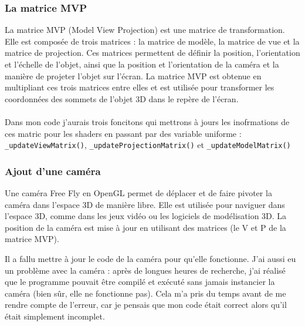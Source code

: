 \documentclass[10pt,a4paper]{article}
\begin{document}
			
		

		\subsubsection{La matrice MVP} %
			La matrice MVP (Model View Projection) est une matrice de transformation. Elle est composée de trois matrices : la matrice de modèle, la matrice de vue et la matrice de projection. Ces matrices permettent de définir la position, l'orientation et l'échelle de l'objet, ainsi que la position et l'orientation de la caméra et la manière de projeter l'objet sur l'écran. La matrice MVP est obtenue en multipliant ces trois matrices entre elles et est utilisée pour transformer les coordonnées des sommets de l'objet 3D dans le repère de l'écran.

			

			\paragraph{} %
				Dans mon code j'aurais trois foncitons qui mettrons à jours les inofrmations de ces matric pour les shaders en passant par des variable uniforme : \texttt{\_updateViewMatrix()}, \texttt{\_updateProjectionMatrix()} et \texttt{\_updateModelMatrix()}

		
		\subsubsection{Ajout d'une caméra} %
			Une caméra Free Fly en OpenGL permet de déplacer et de faire pivoter la caméra dans l'espace 3D de manière libre. Elle est utilisée pour naviguer dans l'espace 3D, comme dans les jeux vidéo ou les logiciels de modélisation 3D. La position de la caméra est mise à jour en utilisant des matrices (le V et P de la matrice MVP).

			Il a fallu mettre à jour le code de la caméra pour qu'elle fonctionne. J'ai aussi eu un problème avec la caméra : après de longues heures de recherche, j'ai réalisé que le programme pouvait être compilé et exécuté sans jamais instancier la caméra (bien sûr, elle ne fonctionne pas). Cela m'a pris du temps avant de me rendre compte de l'erreur, car je pensais que mon code était correct alors qu'il était simplement incomplet.
\end{document}
